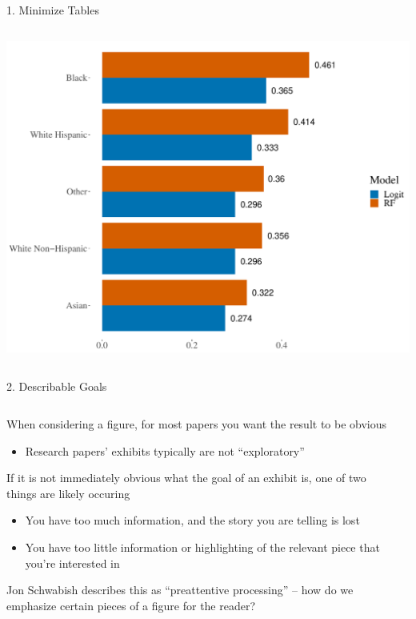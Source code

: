 \documentclass[notes,11pt, aspectratio=169]{beamer}
\newenvironment{wideitemize}{\itemize\addtolength{\itemsep}{10pt}}{\enditemize}
\begin{document}
\begin{frame}{1. Minimize Tables}
\begin{columns}[T]
\begin{column}{.5\textwidth}
{        \includegraphics[width=\linewidth]{sato_sd_model.pdf}
      }
  \end{column}
\end{columns}
\end{frame}



\begin{frame}{2. Describable Goals}
  \begin{columns}[T] %
    \begin{column}{.6\textwidth}
      \begin{wideitemize}
      \item When considering a figure, for most papers you want the
        result to be obvious
        \begin{itemize}
        \item Research papers' exhibits typically are not
          ``exploratory''
        \end{itemize}
      \item If it is not immediately obvious what the goal of an
        exhibit is, one of two things are likely occuring
        \begin{itemize}
        \item You have too much information, and the story you are telling is lost
        \item You have too little information or highlighting of the
          relevant piece that you're interested in
        \end{itemize}
      \item Jon Schwabish describes this as ``preattentive
        processing'' -- how do we emphasize certain pieces of a figure
        for the reader?
      \end{wideitemize}
  \end{column}%
  \hfill%
  \begin{column}{.4\textwidth}
  \end{column}
\end{columns}
\end{frame}
\end{document}
